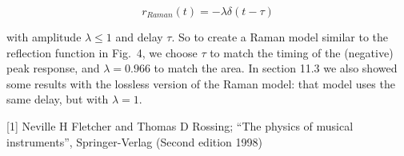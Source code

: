   \begin{equation*}r_{Raman}(t)=-\lambda \delta(t-\tau)\end{equation*} 

  \noindent{}with amplitude $\lambda \le 1$ and delay $\tau$. So to create a 
  Raman model similar to the reflection function in Fig.\ 4, we choose $\tau$ 
  to match the timing of the (negative) peak response, and $\lambda=0.966$ to 
  match the area. In section 11.3 we also showed some results with the lossless 
  version of the Raman model: that model uses the same delay, but with 
  $\lambda=1$. 

  \sectionreferences{}[1] Neville H Fletcher and Thomas D Rossing; “The physics 
  of musical instruments”, Springer-Verlag (Second edition 1998) 